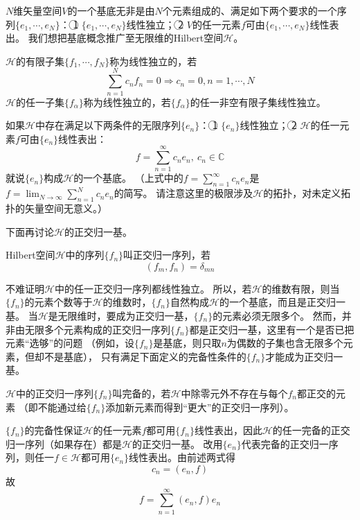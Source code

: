 $N$维矢量空间$V$的一个基底无非是由$N$个元素组成的、满足如下两个要求的一个序列$\{e_1, \cdots, e_N\}$：
\textcircled{1} $\{e_1, \cdots, e_N\}$线性独立；
\textcircled{2} $V$的任一元素$f$可由$\{e_1, \cdots, e_N\}$线性表出。
我们想把基底概念推广至无限维的Hilbert空间$\mathscr{H}$。

\begin{definition}
    $\mathscr{H}$的有限子集$\{f_1, \cdots, f_N\}$称为线性独立的，若
    $$\sum^N_{n = 1}c_nf_n = 0 \Rightarrow c_n = 0, n = 1, \cdots, N$$
    $\mathscr{H}$的任一子集$\{f_\alpha\}$称为线性独立的，若$\{f_\alpha\}$的任一非空有限子集线性独立。
\end{definition}

如果$\mathscr{H}$中存在满足以下两条件的无限序列$\{e_n\}$：
\textcircled{1} $\{e_n\}$线性独立；
\textcircled{2} $\mathscr{H}$的任一元素$f$可由$\{e_n\}$线性表出：
$$f = \sum^\infty_{n = 1}c_ne_n, ~ c_n \in \mathbb{C}$$
就说$\{e_n\}$构成$\mathscr{H}$的一个基底。
（上式中的$\displaystyle f = \sum^\infty_{n = 1}c_ne_n$是$\displaystyle f = \lim_{N \to \infty}\sum^N_{n = 1}c_ne_n$的简写。
请注意这里的极限涉及$\mathscr{H}$的拓扑，对未定义拓扑的矢量空间无意义。）

下面再讨论$\mathscr{H}$的正交归一基。

\begin{definition}
    Hilbert空间$\mathscr{H}$中的序列$\{f_n\}$叫正交归一序列，若
    $$(f_m, f_n) = \delta_{mn}$$
\end{definition}

不难证明$\mathscr{H}$中的任一正交归一序列都线性独立。
所以，若$\mathscr{H}$的维数有限，则当$\{f_n\}$的元素个数等于$\mathscr{H}$的维数时，$\{f_n\}$自然构成$\mathscr{H}$的一个基底，而且是正交归一基。
当$\mathscr{H}$是无限维时，要成为正交归一基，$\{f_n\}$的元素必须无限多个。
然而，并非由无限多个元素构成的正交归一序列$\{f_n\}$都是正交归一基，这里有一个是否已把元素``选够''的问题
（例如，设$\{f_n\}$是基底，则只取$n$为偶数的子集也含无限多个元素，但却不是基底），
只有满足下面定义的完备性条件的$\{f_n\}$才能成为正交归一基。

\begin{definition}
    $\mathscr{H}$中的正交归一序列$\{f_n\}$叫完备的，若$\mathscr{H}$中除零元外不存在与每个$f_n$都正交的元素
    （即不能通过给$\{f_n\}$添加新元素而得到``更大''的正交归一序列）。
\end{definition}

$\{f_n\}$的完备性保证$\mathscr{H}$的任一元素$f$都可用$\{f_n\}$线性表出，因此$\mathscr{H}$的任一完备的正交归一序列（如果存在）都是$\mathscr{H}$的正交归一基。
改用$\{e_n\}$代表完备的正交归一序列，则任一$f \in \mathscr{H}$都可用$\{e_n\}$线性表出。由前述两式得
$$c_n = (e_n, f)$$
故
$$f = \sum^\infty_{n = 1}(e_n, f)e_n$$

